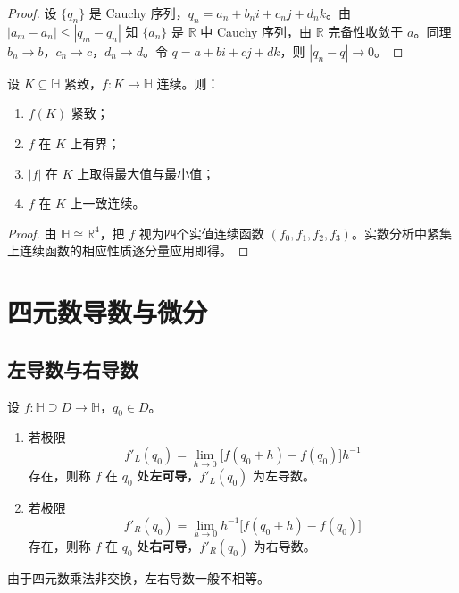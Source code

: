 \begin{proof}
设 $\{q_n\}$ 是 Cauchy 序列，$q_n=a_n+b_ni+c_nj+d_nk$。由 $|a_m-a_n|\le |q_m-q_n|$ 知 $\{a_n\}$ 是 $\mathbb{R}$ 中 Cauchy 序列，由 $\mathbb{R}$ 完备性收敛于 $a$。同理 $b_n\to b$，$c_n\to c$，$d_n\to d$。令 $q=a+bi+cj+dk$，则 $|q_n-q|\to 0$。
\end{proof}

\begin{theorem}[紧集上连续函数的性质]\label{thm:q_continuous_compact}
设 $K\subseteq\mathbb{H}$ 紧致，$f:K\to\mathbb{H}$ 连续。则：
\begin{enumerate}[label=(\roman*)]
    \item $f(K)$ 紧致；
    \item $f$ 在 $K$ 上有界；
    \item $|f|$ 在 $K$ 上取得最大值与最小值；
    \item $f$ 在 $K$ 上一致连续。
\end{enumerate}
\end{theorem}

\begin{proof}
由 $\mathbb{H}\cong\mathbb{R}^4$，把 $f$ 视为四个实值连续函数 $(f_0,f_1,f_2,f_3)$。实数分析中紧集上连续函数的相应性质逐分量应用即得。
\end{proof}

\section{四元数导数与微分}

\subsection{左导数与右导数}

\begin{definition}[左导数与右导数]\label{def:q_derivative_left_right}
设 $f:\mathbb{H}\supseteq D\to\mathbb{H}$，$q_0\in D$。
\begin{enumerate}[label=(\roman*)]
    \item 若极限
    \[
    f'_L(q_0)=\lim_{h\to 0}\bigl[f(q_0+h)-f(q_0)\bigr]h^{-1}
    \]
    存在，则称 $f$ 在 $q_0$ 处\textbf{左可导}，$f'_L(q_0)$ 为左导数。
    \item 若极限
    \[
    f'_R(q_0)=\lim_{h\to 0}h^{-1}\bigl[f(q_0+h)-f(q_0)\bigr]
    \]
    存在，则称 $f$ 在 $q_0$ 处\textbf{右可导}，$f'_R(q_0)$ 为右导数。
\end{enumerate}
由于四元数乘法非交换，左右导数一般不相等。
\end{definition}

